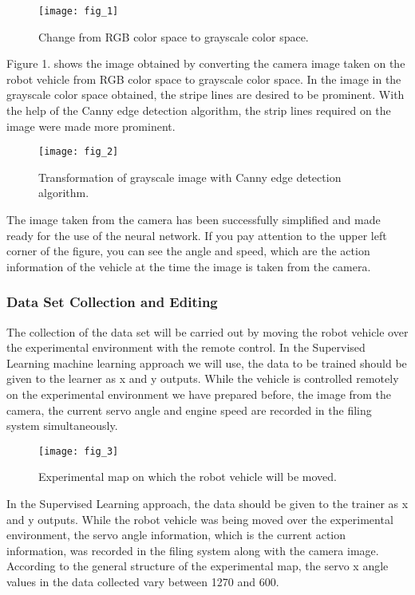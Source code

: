 \documentclass[twocolumn, switch]{article} %
\begin{document}
\begin{figure}[h]
    \centering
    \texttt{[image: fig\_1]}
    \caption{Change from RGB color space to grayscale color
space.}
    \label{fig:fig1}
\end{figure}

Figure 1. shows the image obtained by converting the camera
image taken on the robot vehicle from RGB color space to
grayscale color space. In the image in the grayscale color
space obtained, the stripe lines are desired to be prominent.
With the help of the Canny \cite{xu2017canny} edge detection algorithm,
the strip lines required on the image were made more
prominent.

\begin{figure}[h]
    \centering
    \texttt{[image: fig\_2]}
    \caption{Transformation of grayscale image with Canny edge
detection algorithm.}
    \label{fig:fig2}
\end{figure}

The image taken from the camera has been successfully
simplified and made ready for the use of the neural network.
If you pay attention to the upper left corner of the figure, you
can see the angle and speed, which are the action information
of the vehicle at the time the image is taken from the camera.


\subsubsection{Data Set Collection and Editing}

The collection of the data set will be carried out by moving
the robot vehicle over the experimental environment with the
remote control. In the Supervised Learning machine learning
approach we will use, the data to be trained should be given
to the learner as x and y outputs. While the vehicle is
controlled remotely on the experimental environment we
have prepared before, the image from the camera, the current
servo angle and engine speed are recorded in the filing
system simultaneously.

\begin{figure}[h]
    \centering
    \texttt{[image: fig\_3]}
    \caption{Experimental map on which the robot vehicle will be
moved.}
    \label{fig:fig3}
\end{figure}

In the Supervised Learning approach, the data should be
given to the trainer as x and y outputs. While the robot
vehicle was being moved over the experimental
environment, the servo angle information, which is the
current action information, was recorded in the filing system
along with the camera image. According to the general
structure of the experimental map, the servo x angle values
in the data collected vary between 1270 and 600.
\end{document}
